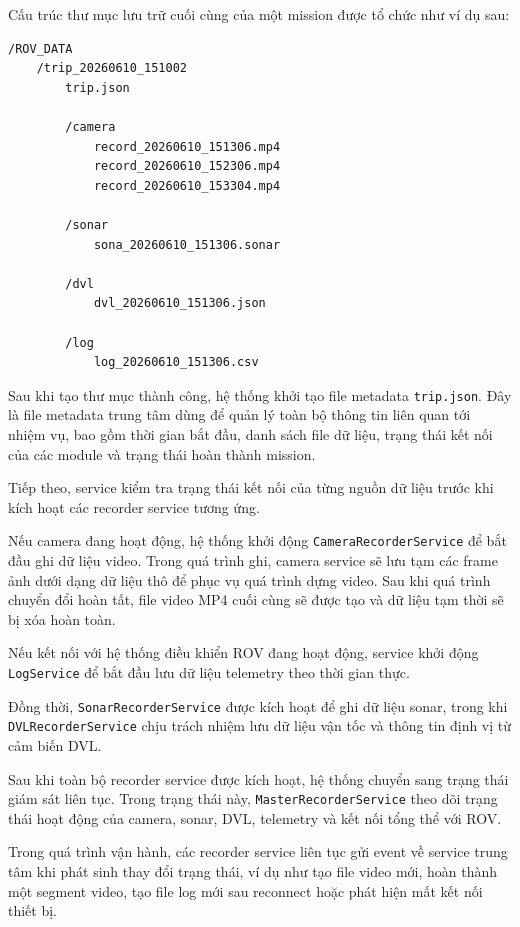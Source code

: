 \documentclass[../DoAn.tex]{subfiles}
\begin{document}
Cấu trúc thư mục lưu trữ cuối cùng của một mission được tổ chức như ví dụ sau:

\begin{verbatim}
/ROV_DATA
    /trip_20260610_151002
        trip.json
        
        /camera
            record_20260610_151306.mp4
            record_20260610_152306.mp4
            record_20260610_153304.mp4

        /sonar
            sona_20260610_151306.sonar

        /dvl
            dvl_20260610_151306.json

        /log
            log_20260610_151306.csv
\end{verbatim}

Sau khi tạo thư mục thành công, hệ thống khởi tạo file metadata \texttt{trip.json}. Đây là file metadata trung tâm dùng để quản lý toàn bộ thông tin liên quan tới nhiệm vụ, bao gồm thời gian bắt đầu, danh sách file dữ liệu, trạng thái kết nối của các module và trạng thái hoàn thành mission.

Tiếp theo, service kiểm tra trạng thái kết nối của từng nguồn dữ liệu trước khi kích hoạt các recorder service tương ứng.

Nếu camera đang hoạt động, hệ thống khởi động \texttt{CameraRecorderService} để bắt đầu ghi dữ liệu video. Trong quá trình ghi, camera service sẽ lưu tạm các frame ảnh dưới dạng dữ liệu thô để phục vụ quá trình dựng video. Sau khi quá trình chuyển đổi hoàn tất, file video MP4 cuối cùng sẽ được tạo và dữ liệu tạm thời sẽ bị xóa hoàn toàn.

Nếu kết nối với hệ thống điều khiển ROV đang hoạt động, service khởi động \texttt{LogService} để bắt đầu lưu dữ liệu telemetry theo thời gian thực.

Đồng thời, \texttt{SonarRecorderService} được kích hoạt để ghi dữ liệu sonar, trong khi \texttt{DVLRecorderService} chịu trách nhiệm lưu dữ liệu vận tốc và thông tin định vị từ cảm biến DVL.

Sau khi toàn bộ recorder service được kích hoạt, hệ thống chuyển sang trạng thái giám sát liên tục. Trong trạng thái này, \texttt{MasterRecorderService} theo dõi trạng thái hoạt động của camera, sonar, DVL, telemetry và kết nối tổng thể với ROV.

Trong quá trình vận hành, các recorder service liên tục gửi event về service trung tâm khi phát sinh thay đổi trạng thái, ví dụ như tạo file video mới, hoàn thành một segment video, tạo file log mới sau reconnect hoặc phát hiện mất kết nối thiết bị.
\end{document}
